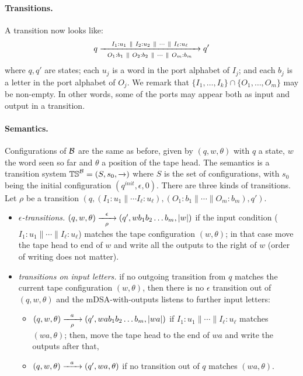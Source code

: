 \paragraph*{Transitions.} A transition now looks like:
\begin{align*}
q \xrightarrow[~~O_1: b_1 ~\parallel~ O_2: b_2 ~\parallel~ \cdots ~\parallel~ O_m: b_m~~]{I_1: u_1 ~\parallel~ I_2: u_2 ~\parallel~ \cdots ~\parallel~ I_\ell: u_\ell} q'
\end{align*}
where $q, q'$ are states; each $u_j$ is a word in the port alphabet of $I_j$; and each $b_j$ is a letter in the port alphabet of $O_j$. We remark that $\{I_1, \dots, I_k\} \cap \{O_1, \dots, O_m\}$ may be non-empty. In other words, some of the ports may appear both as input and output in a transition.  

\paragraph*{Semantics.} Configurations of $\mathcal{B}$ are the same as before, given by $(q, w, \theta)$ with $q$ a state, $w$ the word seen so far and $\theta$ a position of the tape head. The semantics is a transition system $\mathbb{TS}^{\mathcal{B}} = (S, s_0, \xrightarrow{})$ where $S$ is the set of configurations, with $s_0$ being the initial configuration $(q^{init}, \epsilon, 0)$. There are three kinds of transitions. Let $\rho$ be a transition $(q, (I_1: u_1 \parallel \cdots I_\ell:u_\ell), (O_1: b_1 \parallel \cdots \parallel O_m: b_m), q')$.
\begin{itemize}
\item \emph{$\epsilon$-transitions.} $(q, w, \theta) \xrightarrow[\rho]{~~\epsilon~~} (q', wb_1 b_2 \dots b_m, |w|)$ if the input condition ($I_1:u_1 \parallel \cdots \parallel I_\ell:u_\ell$) matches the tape configuration $(w, \theta)$; in that case move the tape head to end of $w$ and write all the outputs to the right of $w$ (order of writing does not matter).
\item \emph{transitions on input letters.} if no outgoing transition from $q$ matches the current tape configuration $(w, \theta)$, then there is no $\epsilon$ transition out of $(q, w, \theta)$ and the mDSA-with-outputs listens to further input letters: 
\begin{itemize}
\item $(q, w, \theta) \xrightarrow[\rho]{~~a~~} (q', wab_1 b_2 \dots b_m, |wa|)$ if $I_1:u_1 \parallel \cdots \parallel I_\ell:u_\ell$ matches $(wa, \theta)$; then, move the tape head to the end of $wa$ and write the outputs after that,
\item $(q, w, \theta) \xrightarrow{~~a~~} (q', wa, \theta)$ if no transition out of $q$ matches $(wa, \theta)$.
\end{itemize}
\end{itemize} 
